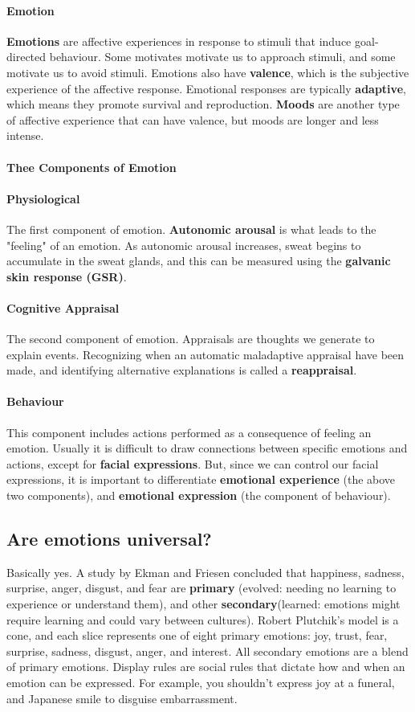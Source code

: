 \documentclass[10pt,letter]{article}
\theoremstyle{plain}
\theoremstyle{definition}
\begin{document}
\paragraph{Emotion}
\textbf{Emotions} are affective experiences in response to stimuli that induce goal-directed behaviour. Some motivates motivate us to approach stimuli, and some motivate us to avoid stimuli. Emotions also have \textbf{valence}, which is the subjective experience of the affective response. Emotional responses are typically \textbf{adaptive}, which means they promote survival and reproduction. \textbf{Moods} are another type of affective experience that can have valence, but moods are longer and less intense. 
\paragraph{Thee Components of Emotion}
\paragraph{Physiological}
The first component of emotion. \textbf{Autonomic arousal} is what leads to the "feeling" of an emotion. As autonomic arousal increases, sweat begins to accumulate in the sweat glands, and this can be measured using the \textbf{galvanic skin response (GSR)}. 
\paragraph{Cognitive Appraisal}
The second component of emotion. Appraisals are thoughts we generate to explain events. Recognizing when an automatic maladaptive appraisal have been made, and identifying alternative explanations is called a \textbf{reappraisal}.

\paragraph{Behaviour}
This component includes actions performed as a consequence of feeling an emotion. Usually it is difficult to draw connections between specific emotions and actions, except for \textbf{facial expressions}. But, since we can control our facial expressions, it is important to differentiate \textbf{emotional experience} (the above two components), and \textbf{emotional expression} (the component of behaviour). 

\subsection*{Are emotions universal?}
Basically yes. A study by Ekman and Friesen concluded that happiness, sadness, surprise, anger, disgust, and fear are \textbf{primary} (evolved: needing no learning to experience or understand them), and other \textbf{secondary}(learned: emotions might require learning and could vary between cultures). Robert Plutchik's model is a cone, and each slice represents one of eight primary emotions: joy, trust, fear, surprise, sadness, disgust, anger, and interest. All secondary emotions are a blend of primary emotions. Display rules are social rules that dictate how and when an emotion can be expressed. For example, you shouldn't express joy at a funeral, and Japanese smile to disguise embarrassment.
\end{document}
